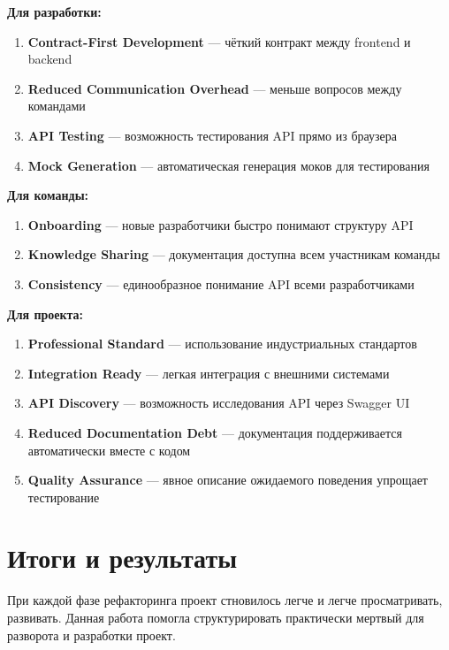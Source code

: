 \documentclass{article}
\begin{document}
\textbf{Для разработки:}
\begin{enumerate}
\item \textbf{Contract-First Development} --- чёткий контракт между frontend и backend
\item \textbf{Reduced Communication Overhead} --- меньше вопросов между командами
\item \textbf{API Testing} --- возможность тестирования API прямо из браузера
\item \textbf{Mock Generation} --- автоматическая генерация моков для тестирования
\end{enumerate}
\textbf{Для команды:}
\begin{enumerate}[resume]
\item \textbf{Onboarding} --- новые разработчики быстро понимают структуру API
\item \textbf{Knowledge Sharing} --- документация доступна всем участникам команды
\item \textbf{Consistency} --- единообразное понимание API всеми разработчиками
\end{enumerate}
\textbf{Для проекта:}
\begin{enumerate}[resume]
\item \textbf{Professional Standard} --- использование индустриальных стандартов
\item \textbf{Integration Ready} --- легкая интеграция с внешними системами
\item \textbf{API Discovery} --- возможность исследования API через Swagger UI
\item \textbf{Reduced Documentation Debt} --- документация поддерживается автоматически вместе с кодом
\item \textbf{Quality Assurance} --- явное описание ожидаемого поведения упрощает тестирование
\end{enumerate}

\section{Итоги и результаты}

При каждой фазе рефакторинга проект стновилось легче и легче просматривать, развивать. Данная работа помогла структурировать практически мертвый для разворота и разработки проект. 
\end{document}
